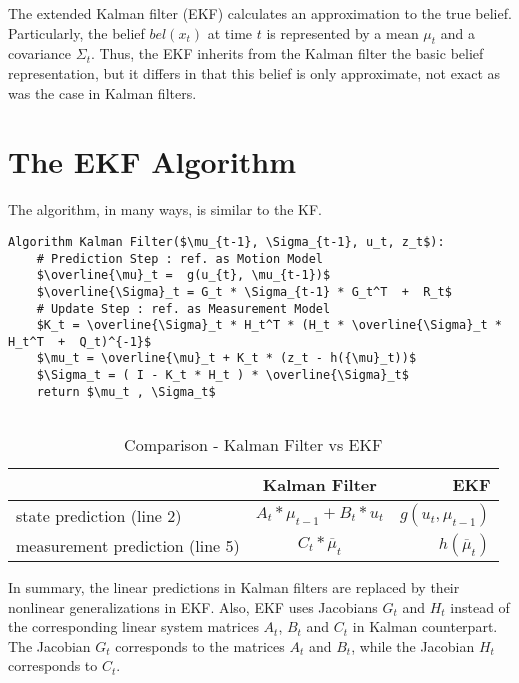 \documentclass[a4paper,12pt]{extarticle}
\theoremstyle{mytheor}
\begin{document}
The extended Kalman filter (EKF) calculates an approximation to the true belief. Particularly, the belief $bel(x_{t})$ at time $t$ is represented by a mean $\mu_{t}$ and a covariance $\Sigma_{t}$. Thus, the EKF inherits from the Kalman filter the basic belief representation, but it differs in that this belief is only approximate, not exact as was the case in Kalman filters.

\vfill
\section*{The EKF Algorithm}

The algorithm, in many ways, is similar to the KF.

\begin{lstlisting}
Algorithm Kalman Filter($\mu_{t-1}, \Sigma_{t-1}, u_t, z_t$):
	# Prediction Step : ref. as Motion Model
	$\overline{\mu}_t =  g(u_{t}, \mu_{t-1})$
	$\overline{\Sigma}_t = G_t * \Sigma_{t-1} * G_t^T  +  R_t$
	# Update Step : ref. as Measurement Model
	$K_t = \overline{\Sigma}_t * H_t^T * (H_t * \overline{\Sigma}_t * H_t^T  +  Q_t)^{-1}$
	$\mu_t = \overline{\mu}_t + K_t * (z_t - h({\mu}_t))$
	$\Sigma_t = ( I - K_t * H_t ) * \overline{\Sigma}_t$
	return $\mu_t , \Sigma_t$
	
\end{lstlisting}

\begin{table}[h!]
   \begin{center}
    \caption{Comparison - Kalman Filter vs EKF}
    \label{tab:table1}
    
    \begin{tabular}{l|c|r} %
      
      \textbf{} & \textbf{Kalman Filter} & \textbf{EKF}\\
      \hline
      state prediction (line 2) & $A_t * \mu_{t-1} + B_t * u_t$ & $g(u_t, \mu_{t-1})$\\
      measurement prediction (line 5) & $C_t * \overline{\mu}_t$ & $h(\overline{\mu}_t)$\\
    
    \end{tabular}
    \end{center}    
\end{table}

In summary, the linear predictions in Kalman filters are replaced by their nonlinear generalizations in EKF. Also, EKF uses Jacobians $G_t$ and $H_t$ instead of the corresponding linear system matrices $A_t$, $B_t$ and $C_t$ in Kalman counterpart. The Jacobian $G_t$ corresponds to the matrices $A_t$ and $B_t$, while the Jacobian $H_t$ corresponds to $C_t$. 
\end{document}
